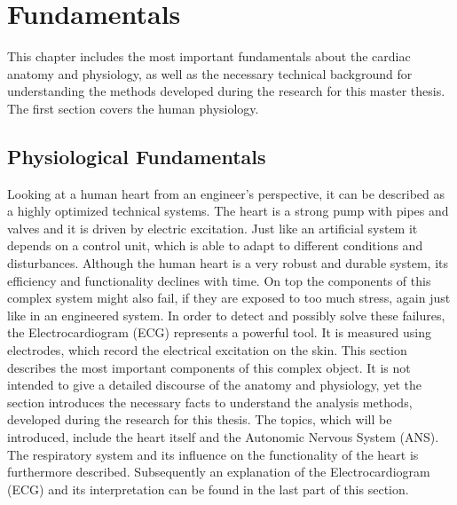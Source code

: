 
\chapter{Fundamentals}
\label{fundamentals}
\thispagestyle{empty}



This chapter includes the most important fundamentals about the cardiac anatomy and physiology, as well as the necessary technical background for understanding the methods developed during the research for this master thesis. The first section covers the human physiology.






\section{Physiological Fundamentals}
\label{physiologicalFundamentals}
Looking at a human heart from an engineer's perspective, it can be described as a highly optimized technical systems. The heart is a strong pump with pipes and valves and it is driven by electric excitation. Just like an artificial system it depends on a control unit, which is able to adapt to different conditions and disturbances. Although the human heart is a very robust and durable system, its efficiency and functionality declines with time. On top the components of this complex system might also fail, if they are exposed to too much stress, again just like in an engineered system. 
In order to detect and possibly solve these failures, the Electrocardiogram (ECG) represents a powerful tool. It is measured using electrodes, which record the electrical excitation on the skin.
\newline
This section describes the most important components of this complex object. It is not intended to give a detailed discourse of the anatomy and physiology, yet the section introduces the necessary facts to understand the analysis methods, developed during the research for this thesis. The topics, which will be introduced, include the heart itself and the Autonomic Nervous System (ANS). The respiratory system and its influence on the functionality of the heart is furthermore described. Subsequently an explanation of the Electrocardiogram (ECG) and its interpretation can be found in the last part of this section.

